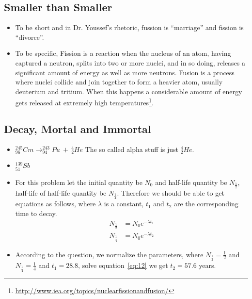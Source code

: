 \documentclass[12pt]{article}
\begin{document}
\subsection{Smaller than Smaller}
\label{sec:smaller-than-smaller}

\begin{itemize}
\item To be short and in Dr. Youssef's rhetoric, fussion is ``marriage''
  and fission is ``divorce''.
\item To be specific, Fission is a reaction when the nucleus of an
  atom, having captured a neutron, splits into two or more nuclei, and
  in so doing, releases a significant amount of energy as well as more
  neutrons.  Fusion is a process where nuclei collide and join
  together to form a heavier atom, usually deuterium and tritium. When
  this happens a considerable amount of energy gets released at
  extremely high
  temperatures\footnote{\url{http://www.iea.org/topics/nuclearfissionandfusion/}}. 
\end{itemize}

\subsection{Decay, Mortal and Immortal}
\label{sec:decay-mort-immort}

\begin{itemize}
\item $^{245}_{96}Cm\rightarrow ^{243}_{94}Pu~+~^{4}_{2}He$ The so
  called alpha stuff is just $^{4}_{2}He$.
\item $^{139}_{51}Sb$
\item For this problem let the initial quantity be $N_{0}$ and
  half-life quantity be $N_{\frac{1}{2}}$, half-life of half-life
  quantity be $N_{\frac{1}{4}}$. Therefore we should be able to get
  equations as follows, where $\lambda$ is a constant, $t_{1}$ and
  $t_{2}$ are the corresponding time to decay.
  \begin{equation}
    \label{eq:12}
    \begin{split}
      N_{\frac{1}{2}} & = N_{0}e^{-\lambda t_{1}}\\[4pt]
      N_{\frac{1}{4}} & = N_{0}e^{-\lambda t_{2}}
    \end{split}
  \end{equation}
\item According to the question, we normalize the parameters, where
  $N_{\frac{1}{2}}=\frac{1}{2}$ and $N_{\frac{1}{4}}=\frac{1}{4}$ and
  $t_{1}=28.8$, solve equation~\eqref{eq:12} we get $t_{2}=57.6$ years.
\end{itemize}
\end{document}

